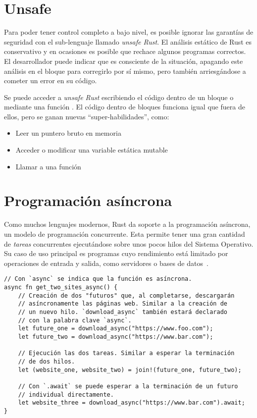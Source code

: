 \section{Unsafe}

Para poder tener control completo a bajo nivel, es posible ignorar las garantías
de seguridad con el sub-lenguaje llamado \emph{unsafe Rust}. El análisis
estático de Rust es conservativo y en ocasiones es posible que rechace algunos
programas correctos. El desarrollador puede indicar que es consciente de la
situación, apagando este análisis en el bloque para corregirlo por sí mismo,
pero también arriesgándose a cometer un error en su código.

Se puede acceder a \emph{unsafe Rust} escribiendo el código dentro de un bloque
 o mediante una función . El código dentro de bloques  funciona igual que fuera de
ellos, pero se ganan nuevas ``super-habilidades'', como:

\begin{itemize}
    \item Leer un puntero bruto en memoria

    \item Acceder o modificar una variable estática mutable

    \item Llamar a una función \unsafe

\end{itemize}

\section{Programación asíncrona}

Como muchos lenguajes modernos, Rust da soporte a la programación asíncrona, un
modelo de programación concurrente. Esta permite tener una gran cantidad de
\emph{tareas} concurrentes ejecutándose sobre unos pocos hilos del Sistema
Operativo. Su caso de uso principal es programas cuyo rendimiento está limitado
por operaciones de entrada y salida, como servidores o bases de
datos~\cite{rustasyncbook}.

\begin{verbatim}
// Con `async` se indica que la función es asíncrona.
async fn get_two_sites_async() {
    // Creación de dos "futuros" que, al completarse, descargarán
    // asíncronamente las páginas web. Similar a la creación de
    // un nuevo hilo. `download_async` también estará declarado
    // con la palabra clave `async`.
    let future_one = download_async("https://www.foo.com");
    let future_two = download_async("https://www.bar.com");

    // Ejecución las dos tareas. Similar a esperar la terminación
    // de dos hilos.
    let (website_one, website_two) = join!(future_one, future_two);

    // Con `.await` se puede esperar a la terminación de un futuro
    // individual directamente.
    let website_three = download_async("https://www.bar.com").await;
}
\end{verbatim}
